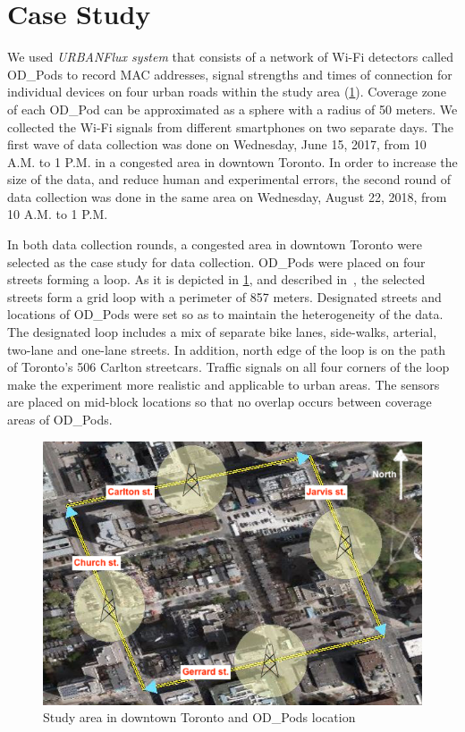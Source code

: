 \section{Case Study}
\label{S:w4}
We used \textit{URBANFlux system} that consists of a network of Wi-Fi detectors called OD\_Pods \cite{farooq2015ubiquitous} to record MAC addresses, signal strengths and times of connection for individual devices on four urban roads within the study area (\cref{fig:odloc}). Coverage zone of each OD\_Pod can be approximated as a sphere with a radius of 50 meters. We collected the Wi-Fi signals from different smartphones on two separate days. The first wave of data collection was done on Wednesday, June 15, 2017, from 10 A.M. to 1 P.M. in a congested area in downtown Toronto. In order to increase the size of the data, and reduce human and experimental errors, the second round of data collection was done in the same area on Wednesday, August 22, 2018, from 10 A.M. to 1 P.M.

In both data collection rounds, a congested area in downtown Toronto were selected as the case study for data collection. OD\_Pods were placed on four streets forming a loop. As it is depicted in \cref{fig:odloc}, and described in~\cite{kalatian2018mobility}, the selected streets form a grid loop with a perimeter of 857 meters. Designated streets and locations of OD\_Pods were set so as to maintain the heterogeneity of the data. The designated loop includes a mix of separate bike lanes, side-walks, arterial, two-lane and one-lane streets. In addition, north edge of the loop is on the path of Toronto's 506 Carlton streetcars. Traffic signals on all four corners of the loop make the experiment more realistic and applicable to urban areas. The sensors are placed on mid-block locations so that no overlap occurs between coverage areas of OD\_Pods.

\begin{figure}
\centering
\includegraphics[scale=0.425]{chapter_2/figures/odpods.png}
\caption{Study area in downtown Toronto and OD\_Pods location}
\label{fig:odloc}
\end{figure}

